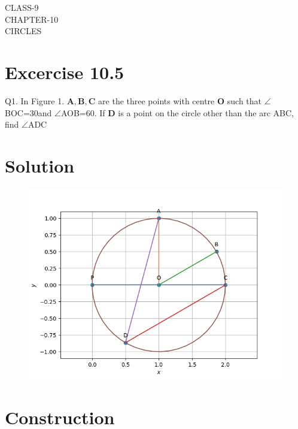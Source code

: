 \documentclass[12pt]{article}
\let\vec\mathbf
\begin{document}
\begin{center}
\textbf\large{CLASS-9\\CHAPTER-10 \\ CIRCLES}

\end{center}
\section*{Excercise 10.5}

Q1. In Figure 1. $\vec{A},\vec{B},\vec{C}$ are the three points with centre $\vec{O}$ such that $\angle$BOC=30\degree and $\angle$AOB=60\degree. If $\vec{D}$ is a point on the circle other than the arc ABC, find $\angle$ADC
\section*{\large Solution}
\begin{figure}[h!]
\centering
\includegraphics[width=\columnwidth]{figs/circle2.png}
\caption{}
\label{fig:Fig1}
\end{figure}
\section*{\large Construction}

\begin{table}[h!]
	\small
	\centering
     
	\label{table:table1}
	\end{table}
\end{document}
